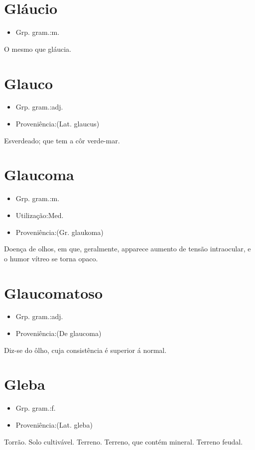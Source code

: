 \section{Gláucio}
\begin{itemize}
\item {Grp. gram.:m.}
\end{itemize}
O mesmo que \textunderscore gláucia\textunderscore .
\section{Glauco}
\begin{itemize}
\item {Grp. gram.:adj.}
\end{itemize}
\begin{itemize}
\item {Proveniência:(Lat. \textunderscore glaucus\textunderscore )}
\end{itemize}
Esverdeado; que tem a côr verde-mar.
\section{Glaucoma}
\begin{itemize}
\item {Grp. gram.:m.}
\end{itemize}
\begin{itemize}
\item {Utilização:Med.}
\end{itemize}
\begin{itemize}
\item {Proveniência:(Gr. \textunderscore glaukoma\textunderscore )}
\end{itemize}
Doença de olhos, em que, geralmente, apparece aumento de tensão intraocular, e o humor vítreo se torna opaco.
\section{Glaucomatoso}
\begin{itemize}
\item {Grp. gram.:adj.}
\end{itemize}
\begin{itemize}
\item {Proveniência:(De \textunderscore glaucoma\textunderscore )}
\end{itemize}
Diz-se do ôlho, cuja consistência é superior á normal.
\section{Gleba}
\begin{itemize}
\item {Grp. gram.:f.}
\end{itemize}
\begin{itemize}
\item {Proveniência:(Lat. \textunderscore gleba\textunderscore )}
\end{itemize}
Torrão.
Solo cultivável.
Terreno.
Terreno, que contém mineral.
Terreno feudal.
